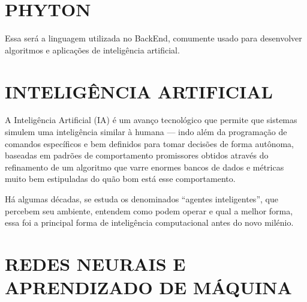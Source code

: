 \section{PHYTON}
\label{sec:PHYTON}
Essa será a linguagem utilizada no BackEnd, comumente usado para desenvolver algoritmos e aplicações de inteligência artificial. 

\section{INTELIGÊNCIA ARTIFICIAL}
\label{sec:inteligênciaartificial}

A Inteligência Artificial (IA) é um avanço tecnológico que permite que sistemas simulem uma inteligência similar à humana — indo além da programação de comandos específicos e bem definidos para tomar decisões de forma autônoma, baseadas em padrões de comportamento promissores obtidos através do refinamento de um algoritmo que varre enormes bancos de dados e métricas muito bem estipuladas do quão bom está esse comportamento. 

Há algumas décadas, se estuda os denominados “agentes inteligentes”, que percebem seu ambiente, entendem como podem operar e qual a melhor forma, essa foi a principal forma de inteligência computacional antes do novo milénio.

\section{REDES NEURAIS E APRENDIZADO DE MÁQUINA}
\label{sec:REDESNEURAISEAPRENDIZADODEMÁQUINA}

